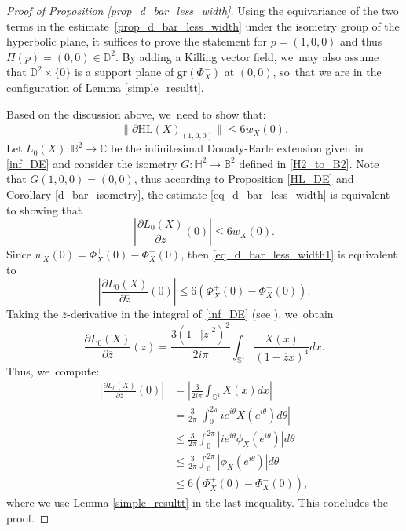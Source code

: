 \begin{proof}[Proof of Proposition \ref{prop_d_bar_less_width}]
Using the equivariance of the two terms in the estimate~\eqref{prop_d_bar_less_width} under the isometry group of the hyperbolic plane, it suffices to prove the statement for \(p = (1,0,0) \) and thus \(\Pi(p) = (0,0) \in \mathbb{D}^2\). By adding a Killing vector field, we~may also assume that \(\mathbb{D}^2 \times \{0\}\) is a support plane of \(\mathrm{gr}(\Phi_X^-)\) at \((0,0)\), so~that we are in the configuration of Lemma \ref{simple_resultt}.

Based on the discussion above, we~need to show that:
\begin{equation}\label{eq_d_bar_less_width}
\lVert \overline{\partial} \mathrm{HL}(X)_{(1,0,0)} \rVert \leq 6 w_X(0).
\end{equation}
Let \(L_0(X): \mathbb{B}^2 \to \mathbb{C} \) be the infinitesimal Douady-Earle extension given in \eqref{inf_DE} and consider the isometry \(G:\mathbb{H}^2 \to \mathbb{B}^2 \) defined in \eqref{H2_to_B2}. Note that \(G(1,0,0) = (0,0) \), thus according to Proposition \ref{HL_DE} and Corollary \ref{d_bar_isometry}, the estimate \eqref{eq_d_bar_less_width} is equivalent to showing that
\begin{equation}\label{eq_d_bar_less_width1}
\left| \frac{\partial L_0(X)}{\partial \overline{z}}(0) \right| \leq 6 w_X(0).
\end{equation}
Since \(w_X(0) = \Phi_X^+(0) - \Phi_X^-(0) \), then \eqref{eq_d_bar_less_width1} is equivalent to
\[
\left| \frac{\partial L_0(X)}{\partial \overline{z}}(0) \right| \leq 6(\Phi_X^+(0) - \Phi_X^-(0)).
\]
Taking the \(\overline{z}\)-derivative in the integral of \eqref{inf_DE} (see \cite[p.\,380]{Extension_with_bounded_derivative}), we~obtain
\[
\frac{\partial L_0(X)}{\partial \overline{z}}(z) = \frac{3(1 - \vert z \vert^2)^2}{2i\pi} \int_{\mathbb{S}^1} \frac{X(x)}{(1 - \overline{z}x)^4} dx.
\]
Thus, we~compute:
\begin{align*}
\left| \frac{\partial L_0(X)}{\partial \overline{z}}(0) \right| &= \left| \frac{3}{2i\pi} \int_{\mathbb{S}^1} X(x) dx \right| \\
&= \frac{3}{2\pi} \left| \int_{0}^{2\pi} i e^{i\theta} X(e^{i\theta}) d\theta \right| \\
&\leq \frac{3}{2\pi} \int_{0}^{2\pi} \left| i e^{i\theta} \phi_X(e^{i\theta}) \right| d\theta \\
&\leq \frac{3}{2\pi} \int_{0}^{2\pi} \left| \phi_X(e^{i\theta}) \right| d\theta \\
&\leq 6(\Phi_X^+(0) - \Phi_X^-(0)),
\end{align*}
where we use Lemma \ref{simple_resultt} in the last inequality. This concludes the proof.
\end{proof}

